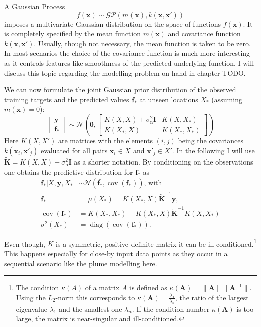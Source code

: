 \documentclass[11pt,a4paper]{scrreprt}
\newcommand{\vc}[1]{\bm{#1}}
\newcommand{\mat}[1]{\bm{#1}}
\DeclareMathOperator{\cov}{cov}
\DeclareMathOperator{\diag}{diag}
\newcommand{\ped}[1]{_{\mathrm{#1}}}
\begin{document}
A Gaussian Process
\begin{equation}
    f(\vc x) \sim \mathcal{GP}(m(\vc x), k(\vc x, \vc x'))
\end{equation}
imposes a multivariate Gaussian distribution on the space of functions $f(\vc 
x)$. It is completely specified by the mean function $m(\vc x)$ and covariance 
function $k(\vc x, \vc x')$. Usually, though not necessary, the mean function is 
taken to be zero. In most scenarios the choice of the covariance function is 
much more interesting as it controls features like smoothness of the predicted 
underlying function. I will discuss this topic regarding the modelling problem 
on hand in chapter TODO.

We can now formulate the joint Gaussian prior distribution of the observed 
training targets and the predicted values $\vc f_*$ at unseen locations $X_*$ 
(assuming $m(\vc x) = 0$):
\begin{equation}
    \left[ \begin{array}{c}\vc y \\ \vc f_* \end{array} \right]
    \sim \mathcal{N}\left(\vc 0,
        \left[ \begin{array}{cc}
            K(X, X) + \sigma\ped{n}^2 \mat I & K(X, X_*) \\ K(X_*, X) & K(X_*, 
            X_*)
        \end{array} \right]
    \right)
\end{equation}
Here $K(X, X')$ are matrices with the elements $(i, j)$ being the covariances 
$k(\vc x_i, \vc x'_j)$ evaluated for all pairs $\vc x_i \in X$ and $\vc x'_j \in 
X'$. In the following I will use $\tilde{\mat K} = K(X, X) + \sigma\ped{n}^2 
\mat I$ as a shorter notation. By conditioning on the observations one obtains 
the predictive distribution for $\vc f_*$ as
\begin{align}
    \vc f_* | X, \vc y, X_* &\sim \mathcal{N}(\bar{\vc f_*}, \cov(\vc 
    f_*))\text{, with}\\
    \bar{\vc f_*} &= \mu(X_*) = K(X_*, X)\tilde{\mat K}^{-1} \vc y\text{,} \\
    \cov(\vc f_*) &= K(X_*, X_*) - K(X_*, X)\tilde{\mat K}^{-1}K(X, X_*) 
    \\
    \sigma^2(X_*) &= \diag(\cov(\vc f_*)) \text{.}
\end{align}

Even though, $K$ is a symmetric, positive-definite matrix it can be 
ill-conditioned.\footnote{The condition $\kappa(A)$ of a matrix $A$ is defined 
    as $\kappa(\mat A) = \|\mat A\| \|\mat A^{-1}\|$. Using the $L_2$-norm this 
    corresponds to $\kappa(\mat A) = \frac{\lambda_1}{\lambda_n}$,
    the ratio of the largest eigenvalue $\lambda_1$ and the smallest one
    $\lambda_n$. If the condition number $\kappa(\mat A)$ is too large, the 
    matrix is near-singular and ill-conditioned.} This happens especially for 
close-by input data points as they occur in a sequential scenario like the plume 
modelling here.
\end{document}
